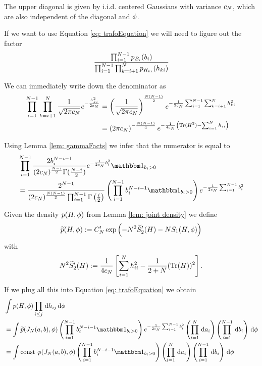 The upper diagonal is given by i.i.d. centered Gaussians with variance $c_N$, which are also independent of the diagonal and $\phi$.

If we want to use Equation \ref{eq: trafoEquation} we will need to figure out the factor
$$ \frac{\prod_{i=1}^{N-1} p_{B_i}(b_i)}{\prod_{i=1}^{N-1}\prod_{k=i+1}^{N} p_{H_{k i}}(h_{k i})} $$

We can immediately write down the denominator as 
\begin{align*}
    \prod_{i=1}^{N-1}\prod_{k=i+1}^{N} \frac{1}{\sqrt{2\pi c_N}} e^{-\frac{h_{ki}^2}{2c_N}}
    & = \left( \frac{1}{\sqrt{2\pi c_N}} \right)^{\frac{N(N-1)}{2}} e^{-\frac{1}{2c_N} \sum_{i=1}^{N-1}\sum_{k=i+1}^{N} h_{ki}^2} \\
    & = \left( 2\pi c_N \right)^{-\frac{N(N-1)}{4}} e^{-\frac{1}{4c_N} \left( \operatorname{Tr}(H^2) - \sum_{i=1}^N h_{ii} \right)}
\end{align*}

Using Lemma \ref{lem: gammaFacts} we infer that the numerator is equal to
\begin{align*}
    & \prod_{i=1}^{\dimension-1} \frac{2 b_i^{\dimension-i-1}}{(2\secCorrFactor)^{\frac{\dimension-i}{2}}\Gamma(\frac{\dimension-i}{2})}  e^{-\frac{1}{2\secCorrFactor} b_i^2} \ind_{b_i>0} \\
    & = \frac{2^{N-1}}{(2\secCorrFactor)^{\frac{\dimension(\dimension-1)}{2}} \prod_{i=1}^{\dimension-1} \Gamma\left(\frac{i}{2}\right)} \left(\prod_{i=1}^{\dimension-1} b_i^{\dimension-i-1} \ind_{b_i>0} \right)
    e^{-\frac{1}{2\secCorrFactor}\sum_{i=1}^{\dimension-1} b_i^2}
\end{align*}

Given the density $p(H,\phi)$ from Lemma \ref{lem: joint density} we define 
\begin{align*}
    \widetilde{p}(H,\phi):= C_N' \exp\left( -N^2 \widetilde{S}_2'(H) - N S_1(H,\phi) \right)
\end{align*}
with
\begin{align*}
    N^2\widetilde{S}_2'(H) := \frac{1}{4 c_N} \left[ \sum_{i=1}^N h_{ii}^2 - \frac{1}{2+N} (\operatorname{Tr}(H))^2 \right].
\end{align*}

If we plug all this into Equation \ref{eq: trafoEquation} we obtain
\begin{align*}
    & \int p(H,\rf) \prod_{i\leq j} \dd h_{ij} \dd \rf \\
    & = \int \widetilde{p}(\jacobiMat,\rf) \left(\prod_{i=1}^{\dimension-1} b_i^{\dimension-i-1} \ind_{b_i>0} \right) e^{-\frac{1}{2\secCorrFactor}\sum_{i=1}^{\dimension-1} b_i^2} \left(\prod_{i=1}^{\dimension} \dd a_{i}\right) \left(\prod_{i=1}^{\dimension-1} \dd b_{i}\right) \dd \rf
    \\
    & = \int \operatorname{const} \cdot p(\jacobiMat,\rf) \left(\prod_{i=1}^{\dimension-1} b_i^{\dimension-i-1} \ind_{b_i>0} \right) \left(\prod_{i=1}^{\dimension} \dd a_{i}\right) \left(\prod_{i=1}^{\dimension-1} \dd b_{i}\right) \dd \rf
\end{align*}

